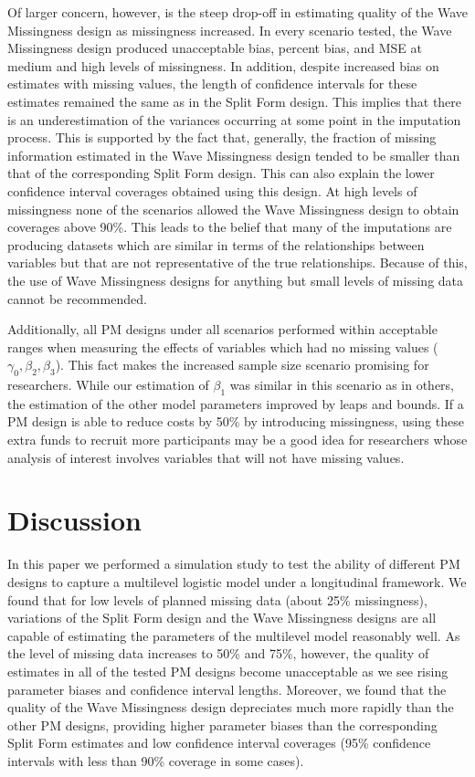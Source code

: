 \documentclass{svjour3}\usepackage[]{graphicx}\usepackage[]{color}
\begin{document}
Of larger concern, however, is the steep drop-off in estimating quality of the Wave Missingness design as missingness increased. In every scenario tested, the Wave Missingness design produced unacceptable bias, percent bias, and MSE at medium and high levels of missingness. In addition, despite increased bias on estimates with missing values, the length of confidence intervals for these estimates remained the same as in the Split Form design. This implies that there is an underestimation of the variances occurring at some point in the imputation process. This is supported by the fact that, generally, the fraction of missing information estimated in the Wave Missingness design tended to be smaller than that of the corresponding Split Form design. This can also explain the lower confidence interval coverages obtained using this design. At high levels of missingness none of the scenarios allowed the Wave Missingness design to obtain coverages above 90\%. This leads to the belief that many of the imputations are producing datasets which are similar in terms of the relationships between variables but that are not representative of the true relationships. Because of this, the use of Wave Missingness designs for anything but small levels of missing data cannot be recommended. \par

Additionally, all PM designs under all scenarios performed within acceptable ranges when measuring the effects of variables which had no missing values ($\gamma_0, \beta_2, \beta_3$). This fact makes the increased sample size scenario promising for researchers. While our estimation of $\beta_1$ was similar in this scenario as in others, the estimation of the other model parameters improved by leaps and bounds. If a PM design is able to reduce costs by 50\% by introducing missingness, using these extra funds to recruit more participants may be a good idea for researchers whose analysis of interest involves variables that will not have missing values. \par

\section{Discussion}
\label{4}
In this paper we performed a simulation study to test the ability of different PM designs to capture a multilevel logistic model under a longitudinal framework. We found that for low levels of planned missing data (about 25\% missingness), variations of the Split Form design and the Wave Missingness designs are all capable of estimating the parameters of the multilevel model reasonably well. As the level of missing data increases to 50\% and 75\%, however, the quality of estimates in all of the tested PM designs become unacceptable as we see rising parameter biases and confidence interval lengths. Moreover, we found that the quality of the Wave Missingness design depreciates much more rapidly than the other PM designs, providing higher parameter biases than the corresponding Split Form estimates and low confidence interval coverages (95\% confidence intervals with less than 90\% coverage in some cases). \par
\end{document}
